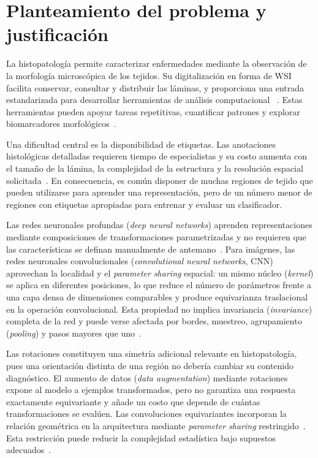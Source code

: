 \chapter{Planteamiento del problema y justificación}

La histopatología permite caracterizar enfermedades mediante la observación de
la morfología microscópica de los tejidos. Su digitalización en forma de WSI
facilita conservar, consultar y distribuir las láminas, y proporciona una entrada
estandarizada para desarrollar herramientas de análisis computacional
~\cite{pallua_future_2020,song_artificial_2023}. Estas herramientas pueden apoyar tareas repetitivas, cuantificar patrones y
explorar biomarcadores morfológicos~\cite{verghese_computational_2023}.

Una dificultad central es la disponibilidad de etiquetas. Las anotaciones
histológicas detalladas requieren tiempo de especialistas y su costo aumenta con
el tamaño de la lámina, la complejidad de la estructura y la resolución espacial
solicitada~\cite{lindman_annotations_2019}. En consecuencia, es común disponer de muchas
regiones de tejido que pueden utilizarse para aprender una representación, pero
de un número menor de regiones con etiquetas apropiadas para entrenar y evaluar
un clasificador.

Las redes neuronales profundas (\emph{deep neural networks}) aprenden
representaciones mediante composiciones
de transformaciones parametrizadas y no requieren que las características se
definan manualmente de antemano~\cite{goodfellow_deep_2016}. Para imágenes, las
redes neuronales convolucionales (\emph{convolutional neural networks}, CNN)
aprovechan la localidad y el \emph{parameter sharing} espacial: un mismo núcleo (\emph{kernel})
se aplica en diferentes posiciones, lo que reduce el número de parámetros frente
a una capa densa de dimensiones comparables y produce equivarianza traslacional
en la operación convolucional. Esta propiedad no implica invariancia (\emph{invariance}) completa de
la red y puede verse afectada por bordes, muestreo, agrupamiento (\emph{pooling}) y pasos mayores
que uno~\cite{cohen_group_2016}.

Las rotaciones constituyen una simetría adicional relevante en histopatología,
pues una orientación distinta de una región no debería cambiar su contenido
diagnóstico. El aumento de datos (\emph{data augmentation}) mediante rotaciones
expone al modelo a ejemplos
transformados, pero no garantiza una respuesta exactamente equivariante y añade
un costo que depende de cuántas transformaciones se evalúen. Las convoluciones
equivariantes incorporan la relación geométrica en la arquitectura mediante
\emph{parameter sharing} restringido~\cite{veeling_rotation_2018}. Esta restricción puede reducir la complejidad estadística bajo supuestos
adecuados~\cite{elesedy_provably_2021}.

